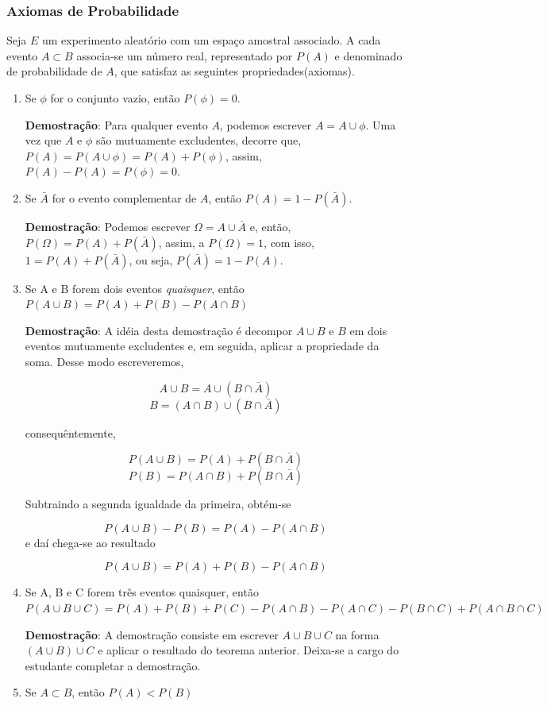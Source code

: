 \newpage
\subsubsection{Axiomas de Probabilidade}

\inic Seja $E$ um experimento aleatório com um espaço amostral associado. A cada evento $A \subset B$ associa-se um número real, representado por $P(A)$ e denominado de probabilidade de $A$, que satisfaz as seguintes propriedades(axiomas).

\begin{enumerate}
    \item Se $\phi$ for o conjunto vazio, então
    $P(\phi)=0$.

\textbf{Demostração}: Para qualquer evento $A$, podemos escrever
$A=A\cup \phi$. Uma vez que $A$ e $\phi$ são mutuamente
excludentes, decorre que, $P(A)=P(A\cup \phi)= P(A)+P(\phi)$,
assim, $P(A)- P(A)= P(\phi)= 0$.
    \item Se $\bar{A}$ for o evento complementar de $A$, então
    $P(A)=1-P(\bar{A})$.

\textbf{Demostração}: Podemos escrever $\Omega = A \cup \bar{A}$
e, então, $P(\Omega)= P(A)+ P(\bar{A})$, assim, a $P(\Omega)=1$,
com isso, $1= P(A)+P(\bar{A})$, ou seja, $P(\bar{A})= 1- P(A)$.
    \item Se A e B forem dois eventos \emph{quaisquer}, então $P(A\cup B)=P(A)+P(B)-P(A\cap B)$

\textbf{Demostração}: A idéia desta demostração é decompor $A\cup
B$ e $B$ em dois eventos mutuamente excludentes e, em seguida,
aplicar a propriedade da soma. Desse modo escreveremos,

$$A \cup B= A\cup (B\cap \bar{A})$$
$$B= (A \cap B) \cup (B\cap \bar{A})$$

consequêntemente,

$$P(A \cup B)= P(A)+P(B \cap \bar{A})$$
$$ P(B) = P(A \cap B) + P(B \cap \bar{A})$$

Subtraindo a segunda igualdade da primeira, obtém-se

$$ P(A \cup B) - P(B) = P(A)- P(A \cap B)$$
 e daí chega-se ao resultado

$$ P(A \cup B) = P(A)+P(B)- P(A \cap B)$$
    \item Se A, B e C forem três eventos quaisquer, então $P(A \cup B \cup C) = P(A)+P(B)+P(C)-P(A\cap B)-P(A\cap C)-P(B\cap C)+P(A\cap B \cap C)$


\textbf{ \maltese Demostração}: A demostração consiste em escrever
$A \cup B \cup C$ na forma $(A \cup B)\cup C$ e aplicar o
resultado do teorema anterior. Deixa-se a cargo do estudante
completar a demostração.

    \item Se $A \subset B$, então $P(A) < P(B)$
\end{enumerate}

